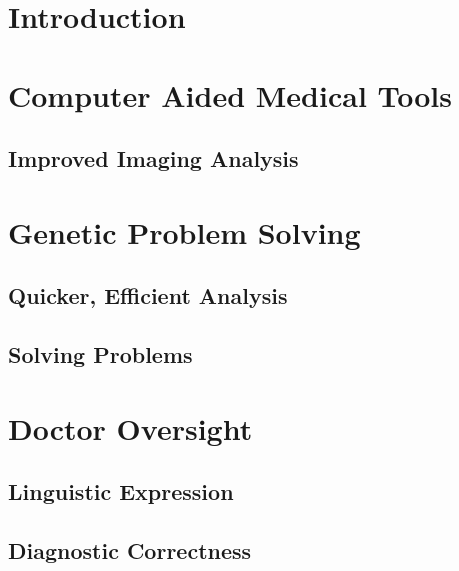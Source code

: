 \documentclass[11pt]{article}
\begin{document}
\begin{doublespace}
\section{Introduction}

\section{Computer Aided Medical Tools}

\subsection{Improved Imaging Analysis}

\section{Genetic Problem Solving}

\subsection{Quicker, Efficient Analysis}

\subsection{Solving Problems}

\section{Doctor Oversight}

\subsection{Linguistic Expression}

\subsection{Diagnostic Correctness}


\end{doublespace}

\nocite{*}



\end{document}
